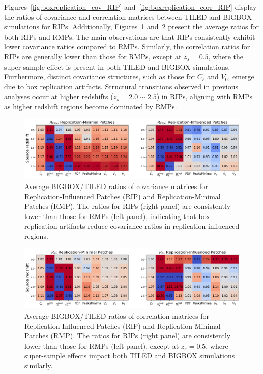 Figures~\ref{fig:boxreplication_cov_RIP} and~\ref{fig:boxreplication_corr_RIP} display the ratios of covariance and correlation matrices between TILED and BIGBOX simulations for RIPs. Additionally, Figures~\ref{fig:boxreplication_avg_cov} and~\ref{fig:boxreplication_avg_corr} present the average ratios for both RIPs and RMPs. The main observations are that RIPs consistently exhibit lower covariance ratios compared to RMPs. Similarly, the correlation ratios for RIPs are generally lower than those for RMPs, except at $z_s=0.5$, where the super-sample effect is present in both TILED and BIGBOX simulations. Furthermore, distinct covariance structures, such as those for $C_\ell$ and $V_0$, emerge due to box replication artifacts. Structural transitions observed in previous analyses occur at higher redshifts ($z_s=2.0\sim2.5$) in RIPs, aligning with RMPs as higher redshift regions become dominated by RMPs.

\begin{figure}[ht]
    \centering
    \includegraphics[width=\textwidth]{figures/results/BR_avg_cov_ratio.png}
    \caption[Average BIGBOX / TILED ratios of covariance matrices for the RIPs and the RMPs]{Average BIGBOX/TILED ratios of covariance matrices for Replication-Influenced Patches (RIP) and Replication-Minimal Patches (RMP). The ratios for RIPs (right panel) are consistently lower than those for RMPs (left panel), indicating that box replication artifacts reduce covariance ratios in replication-influenced regions.}
    \label{fig:boxreplication_avg_cov}
\end{figure}

\begin{figure}[ht]
    \includegraphics[width=\textwidth]{figures/results/BR_avg_corr_ratio.png}
    \caption[Average BIGBOX / TILED ratios of correlation matrices for the RIPs and the RMPs]{Average BIGBOX/TILED ratios of correlation matrices for Replication-Influenced Patches (RIP) and Replication-Minimal Patches (RMP). The ratios for RIPs (right panel) are consistently lower than those for RMPs (left panel), except at $z_s = 0.5$, where super-sample effects impact both TILED and BIGBOX simulations similarly.}
    \label{fig:boxreplication_avg_corr}
\end{figure}

